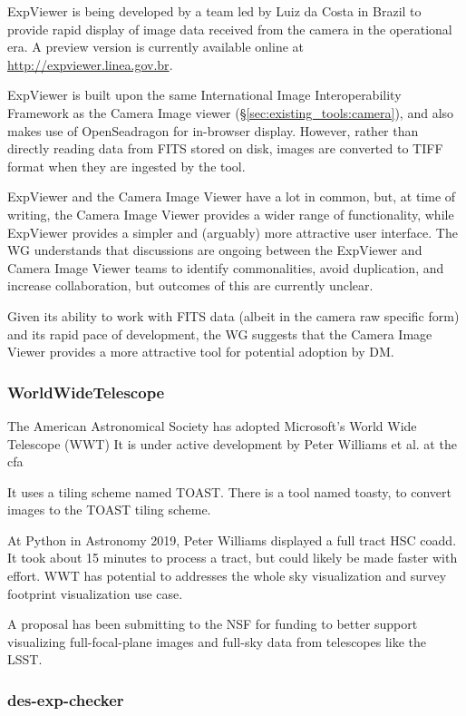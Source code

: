 ExpViewer is being developed by a team led by Luiz da Costa in Brazil to provide rapid display of image data received from the camera in the operational era.
A preview version is currently available online at \url{http://expviewer.linea.gov.br}.

ExpViewer is built upon the same International Image Interoperability Framework as the Camera Image viewer (\S\ref{sec:existing_tools:camera}), and also makes use of OpenSeadragon for in-browser display.
However, rather than directly reading data from FITS stored on disk, images are converted to TIFF format when they are ingested by the tool.

ExpViewer and the Camera Image Viewer have a lot in common, but, at time of writing, the Camera Image Viewer provides a wider range of functionality, while ExpViewer provides a simpler and (arguably) more attractive user interface.
The WG understands that discussions are ongoing between the ExpViewer and Camera Image Viewer teams to identify commonalities, avoid duplication, and increase collaboration, but outcomes of this are currently unclear.

Given its ability to work with FITS data (albeit in the camera raw specific form) and its rapid pace of development, the WG suggests that the Camera Image Viewer provides a more attractive tool for potential adoption by DM.

\subsubsection{WorldWideTelescope}

The American Astronomical Society has adopted Microsoft's World Wide Telescope (WWT)
It is under active development by Peter Williams et al. at the cfa

It uses a tiling scheme named TOAST.
There is a tool named toasty, to convert images to the TOAST tiling scheme.

At Python in Astronomy 2019,  Peter Williams displayed a full tract HSC coadd.
It took about 15 minutes to process a tract, but could likely be made faster with effort.
WWT has potential to addresses the whole sky visualization and survey footprint visualization use case.

A proposal has been submitting to the NSF for funding to better support visualizing full-focal-plane images and full-sky data from telescopes like the LSST.

\subsubsection{des-exp-checker}


